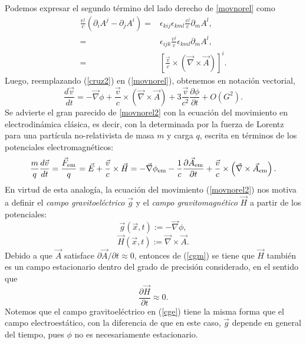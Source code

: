 Podemos expresar el segundo término del lado derecho de \eqref{movnorel} como
\begin{align}
\frac{v^j}{c}\left( \partial_iA^{j}-\partial_jA^{i}\right)={}&\epsilon_{kij}\epsilon_{kml}\frac{v^j}{c}\partial_m A^{l},\\
={}&\epsilon_{ijk}\frac{v^j}{c}\epsilon_{kml}\partial_m A^{l},\\
={}&\left[ \frac{\vec{v}}{c}\times\left( \vec{\nabla}\times\vec{A}\right) \right]^i.\label{cruz2}
\end{align}
Luego, reemplazando (\ref{cruz2}) en (\ref{movnorel}), obtenemos en notación vectorial,
\begin{equation}
\frac{d\vec{v}}{dt}=-\vec{\nabla}\phi+\frac{\vec{v}}{c}\times\left( \vec{\nabla}\times\vec{A}\right)+3\frac{\vec{v}}{c^2}\frac{\partial \phi}{\partial t}+O\left(G^2\right).\label{movnorel2}
\end{equation}
Se advierte el gran parecido de \eqref{movnorel2} con la ecuación del movimiento en electrodinámica clásica, es decir, con la determinada por la fuerza de Lorentz para una partícula no-relativista de masa $m$ y carga $q$, escrita en términos de los potenciales electromagnéticos:
\begin{equation}
\frac{m}{q}\frac{d\vec{v}}{dt}=\frac{\vec{F}_{\rm em}}{q}=\vec{E}+\frac{\vec{v}}{c}\times\vec{H}=-\vec{\nabla}\phi_{\rm em}-\frac{1}{c}\frac{\partial \vec{A}_{\rm em}}{\partial t}+\frac{\vec{v}}{c}\times\left(\vec{\nabla}\times\vec{A}_{\rm em}\right).\label{fuerzalorentz}
\end{equation}
En virtud de esta analogía, la ecuación del movimiento (\ref{movnorel2}) nos motiva a definir el \textit{campo gravitoeléctrico} $\vec{g}$ y el \textit{campo gravitomagnético} $\vec{H}$ a partir de los potenciales:
\begin{equation}\boxed{
\vec{g}(\vec{x},t):=-\vec{\nabla}\phi,}\label{cge}
\end{equation}
\begin{equation}\boxed{
\vec{H}(\vec{x},t):=\vec{\nabla}\times\vec{A}.}\label{cgm}
\end{equation}
Debido a que $\vec{A}$ satisface $\partial \vec{A}/\partial t\approx 0$, entonces de (\ref{cgm}) se tiene que $\vec{H}$ también es un campo estacionario dentro del grado de precisión considerado, en el sentido que
\begin{equation}
\frac{\partial \vec{H}}{\partial t}\approx 0.
\end{equation}
Notemos que el campo gravitoeléctrico en (\ref{cge}) tiene la misma forma que el campo electroestático,
con la diferencia de que en este caso, $\vec{g}$ depende en general del tiempo, pues $\phi$ no es necesariamente estacionario.

